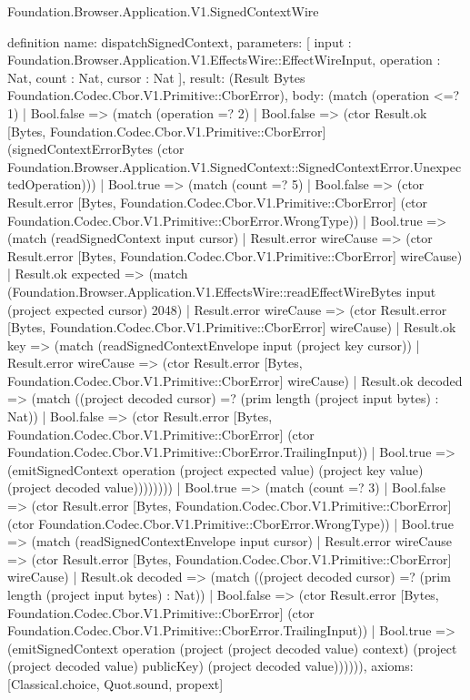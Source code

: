 \begin{lexlean}{Foundation.Browser.Application.V1.SignedContextWire}
\begin{semanticmodule}
definition{
  name: dispatchSignedContext,
  parameters: [
    input : Foundation.Browser.Application.V1.EffectsWire::EffectWireInput,
    operation : Nat,
    count : Nat,
    cursor : Nat
  ],
  result: (Result Bytes Foundation.Codec.Cbor.V1.Primitive::CborError),
  body: (match (operation <=? 1)
    | Bool.false => (match (operation =? 2)
      | Bool.false => (ctor Result.ok [Bytes, Foundation.Codec.Cbor.V1.Primitive::CborError] (signedContextErrorBytes (ctor Foundation.Browser.Application.V1.SignedContext::SignedContextError.UnexpectedOperation)))
      | Bool.true => (match (count =? 5)
        | Bool.false => (ctor Result.error [Bytes, Foundation.Codec.Cbor.V1.Primitive::CborError] (ctor Foundation.Codec.Cbor.V1.Primitive::CborError.WrongType))
        | Bool.true => (match (readSignedContext input cursor)
          | Result.error wireCause => (ctor Result.error [Bytes, Foundation.Codec.Cbor.V1.Primitive::CborError] wireCause)
          | Result.ok expected => (match (Foundation.Browser.Application.V1.EffectsWire::readEffectWireBytes input (project expected cursor) 2048)
            | Result.error wireCause => (ctor Result.error [Bytes, Foundation.Codec.Cbor.V1.Primitive::CborError] wireCause)
            | Result.ok key => (match (readSignedContextEnvelope input (project key cursor))
              | Result.error wireCause => (ctor Result.error [Bytes, Foundation.Codec.Cbor.V1.Primitive::CborError] wireCause)
              | Result.ok decoded => (match ((project decoded cursor) =? (prim length (project input bytes) : Nat))
                | Bool.false => (ctor Result.error [Bytes, Foundation.Codec.Cbor.V1.Primitive::CborError] (ctor Foundation.Codec.Cbor.V1.Primitive::CborError.TrailingInput))
                | Bool.true => (emitSignedContext operation (project expected value) (project key value) (project decoded value))))))))
    | Bool.true => (match (count =? 3)
      | Bool.false => (ctor Result.error [Bytes, Foundation.Codec.Cbor.V1.Primitive::CborError] (ctor Foundation.Codec.Cbor.V1.Primitive::CborError.WrongType))
      | Bool.true => (match (readSignedContextEnvelope input cursor)
        | Result.error wireCause => (ctor Result.error [Bytes, Foundation.Codec.Cbor.V1.Primitive::CborError] wireCause)
        | Result.ok decoded => (match ((project decoded cursor) =? (prim length (project input bytes) : Nat))
          | Bool.false => (ctor Result.error [Bytes, Foundation.Codec.Cbor.V1.Primitive::CborError] (ctor Foundation.Codec.Cbor.V1.Primitive::CborError.TrailingInput))
          | Bool.true => (emitSignedContext operation (project (project decoded value) context) (project (project decoded value) publicKey) (project decoded value)))))),
  axioms: [Classical.choice, Quot.sound, propext]
}


\end{semanticmodule}
\end{lexlean}
